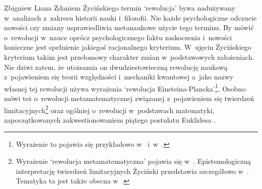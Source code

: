 \begin{artplenv}{Zbigniew Liana}
Zdaniem Życińskiego
\parencites*[s.~7]{zycinski_structure_1988}[s.~13]{zycinski_struktura_2013}
termin `rewolucja' bywa nadużywany w~analizach z~zakresu
historii nauki i~filozofii. Nie każde psychologiczne odczucie nowości czy zmiany usprawiedliwia metanaukowe
użycie tego terminu. By mówić o~rewolucji w~nauce oprócz psychologicznego faktu zaskoczenia i~nowości konieczne jest
spełnienie jakiegoś racjonalnego kryterium. W~ujęciu Życińskiego kryterium takim jest przełomowy charakter zmian w~podstawowych
założeniach. Nie dziwi zatem, że utożsamia on dwudziestowieczną rewolucję naukową z~pojawieniem się teorii
względności i~mechaniki kwantowej a~jako nazwy własnej tej rewolucji używa wyrażenia `rewolucja
Einsteina-Plancka'\footnote{Wyrażenie to pojawia się przykładowo
w~\parencites[s.~13.25]{zycinski_structure_1988}[s.~24.45]{zycinski_struktura_2013}
i~w~\parencite[s.~228,258]{zycinski_elementy_2015}.
}. Osobno mówi też o~rewolucji metamatematycznej związanej z~pojawieniem się twierdzeń
limitacyjnych\footnote{Wyrażenie `rewolucja metamatematyczna' pojawia się
w~\parencites[s.~101]{zycinski_structure_1988}[s.~181]{zycinski_struktura_2013}.
Epistemologiczną interpretację twierdzeń
limitacyjnych Życiński przedstawia szczegółowo
w~\parencites*[s.~118–126]{zycinski_teizm_1985}[s.~18–46]{zycinski_teizm_1988}.
Tematyka ta jest także obecna
w~\parencites[rozdział IV]{zycinski_structure_1988,zycinski_struktura_2013}[s.~61–68]{zycinski_granice_1993}[s.~262–276]{zycinski_elementy_1996}.
} oraz ogólniej o~rewolucji w~podstawach matematyki,
zapoczątkowanych zakwestionowaniem piątego postulatu Euklidesa
\parencite[zob.][s.~196]{zycinski_jezyk_1983}.


\end{artplenv}
